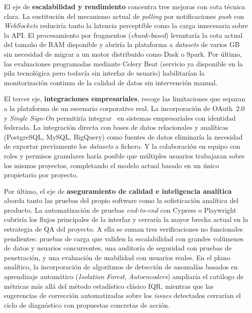 El eje de \textbf{escalabilidad y rendimiento} concentra tres mejoras
con cota técnica clara.  La sustitución del mecanismo actual de
\emph{polling} por notificaciones \emph{push} con \emph{WebSockets}
reduciría tanto la latencia perceptible como la carga innecesaria sobre
la \ac{API}.  El procesamiento por fragmentos (\emph{chunk-based})
levantaría la cota actual del tamaño de RAM disponible y abriría la
plataforma a \emph{datasets} de varios GB sin necesidad de migrar a un
motor distribuido como Dask o Spark.  Por último, las evaluaciones
programadas mediante Celery Beat (servicio ya disponible en la pila
tecnológica pero todavía sin interfaz de usuario) habilitarían la
monitorización continua de la calidad de datos sin intervención manual.

El tercer eje, \textbf{integraciones empresariales}, recoge las
limitaciones que separan a la plataforma de un escenario corporativo
real.  La incorporación de OAuth~2.0 y \emph{Single Sign-On} permitiría
integrar \dataqual\ en sistemas empresariales con identidad federada.
La integración directa con bases de datos relacionales y analíticas
(PostgreSQL, MySQL, BigQuery) como fuentes de datos eliminaría la
necesidad de exportar previamente los \emph{datasets} a fichero.  Y la
colaboración en equipo con roles y permisos granulares haría posible
que múltiples usuarios trabajaran sobre los mismos proyectos,
completando el modelo actual basado en un único propietario por
proyecto.

Por último, el eje de \textbf{aseguramiento de calidad e inteligencia
analítica} aborda tanto las pruebas del propio software como la
sofisticación analítica del producto.  La automatización de pruebas
\emph{end-to-end} con Cypress o Playwright cubriría los flujos
principales de la interfaz y cerraría la mayor brecha actual en la
estrategia de \ac{QA} del proyecto.  A ella se suman tres verificaciones
no funcionales pendientes: pruebas de carga que validen la escalabilidad
con grandes volúmenes de datos y usuarios concurrentes, una auditoría de
seguridad con pruebas de penetración, y una evaluación de usabilidad con
usuarios reales.  En el plano analítico, la
incorporación de algoritmos de detección de anomalías basados en
aprendizaje automático (\emph{Isolation Forest},
\emph{Autoencoders}) ampliaría el catálogo de métricas más allá del
método estadístico clásico \ac{IQR}, mientras que las sugerencias de
corrección automatizadas sobre los \emph{issues} detectados cerrarían
el ciclo de diagnóstico con propuestas concretas de acción.


